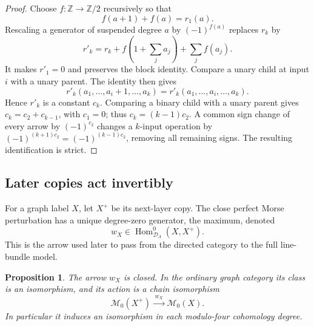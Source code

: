 \documentclass[11pt]{article}
\newtheorem{proposition}[theorem]{Proposition}
\theoremstyle{definition}
\theoremstyle{remark}
\numberwithin{equation}{section}
\begin{document}
\begin{proof}
Choose \(f:\mathbb Z\to\mathbb Z/2\) recursively so that
\[
 f(a+1)+f(a)=r_1(a).
\]
Rescaling a generator of suspended degree \(a\) by \((-1)^{f(a)}\)
replaces \(r_k\) by
\[
 r'_k=r_k+f(1+\textstyle\sum_j a_j)+\sum_j f(a_j).
\]
It makes \(r'_1=0\) and preserves the block identity.
Compare a unary child at input \(i\) with a unary parent.  The identity
then gives
\[
 r'_k(a_1,\ldots,a_i+1,\ldots,a_k)
     =r'_k(a_1,\ldots,a_i,\ldots,a_k).
\]
Hence \(r'_k\) is a constant \(c_k\).  Comparing a binary child with a
unary parent gives \(c_k=c_2+c_{k-1}\), with \(c_1=0\); thus
\(c_k=(k-1)c_2\).  A common sign change of every arrow by
\((-1)^{c_2}\) changes a \(k\)-input operation by
\((-1)^{(k+1)c_2}=(-1)^{(k-1)c_2}\), removing all remaining signs.
The resulting identification is strict.
\end{proof}

\subsection{Later copies act invertibly}

For a graph label \(X\), let \(X^+\) be its next-layer copy.
The close perfect Morse perturbation has a unique degree-zero
generator, the maximum, denoted
\[
 w_X\in\operatorname{Hom}_{\mathcal D_\Lambda}^0(X,X^+).
\]
This is the arrow used later to pass from the directed category to
the full line-bundle model.

\begin{proposition}\label{cat:continuation}
The arrow \(w_X\) is closed.  In the ordinary graph category its class is
an isomorphism, and its action is a chain isomorphism
\[
 \mathcal M_0(X^+)\xrightarrow{\;w_X\;}\mathcal M_0(X).
\]
In particular it induces an isomorphism in each modulo-four cohomology
degree.
\end{proposition}
\end{document}
